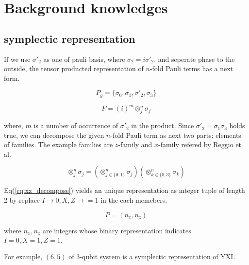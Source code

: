 \documentclass[twocolumn]{article}
\begin{document}
\section{Background knowledges}


\subsection{symplectic representation}

If we use $\sigma'_2$ as one of pauli basis, where $\sigma_2 = i \sigma'_2$,
and seperate phase to the outside,
the tensor producted representation of $n$-fold Pauli terms has a next form.

\begin{equation}
    P_{g} = \{\sigma_0 , \sigma_1, \sigma'_2, \sigma_3\}
\end{equation}

\begin{equation}
    P = (i)^m \otimes_j^n \sigma_j
\end{equation}

where, $m$ is a number of occurrence of $\sigma'_2$ in the product.
Since $\sigma'_2 = \sigma_1 \sigma_3$ holds true, we can decompose the given $n$-fold Pauli term as next two
parts; elements of families. 
The example families are $z$-family and $x$-family refered by Reggio et al\cite{reggio_fast_2023}.

\begin{equation}
    \label{eq:xz_decompose}
    \otimes_j^n \sigma_j = \left( \otimes_{j \in \{0, 1\}}^n \sigma_j \right) \left( \otimes_{k \in \{0, 3\}}^n \sigma_k \right)
\end{equation}

Eq(\ref{eq:xz_decompose}) yields an unique representation as integer tuple of length 2 by 
replace $I \rightarrow 0, X, Z \rightarrow =1$ in the each memebers.

\begin{equation}
    P = (n_x, n_z)
\end{equation}

where $n_x, n_z$ are integers whose binary representation indicates $I=0, X=1, Z=1$.

For example, $(6, 5)$ of 3-qubit system is a symplectic representation of $\text{YXI}$.
\end{document}
